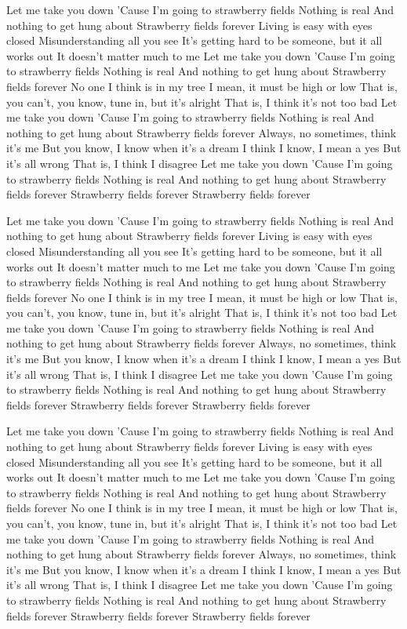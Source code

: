 \documentclass[12pt]{article}
\begin{document}
Let me take you down
'Cause I'm going to strawberry fields
Nothing is real
And nothing to get hung about
Strawberry fields forever
Living is easy with eyes closed
Misunderstanding all you see
It's getting hard to be someone, but it all works out
It doesn't matter much to me
Let me take you down
'Cause I'm going to strawberry fields
Nothing is real
And nothing to get hung about
Strawberry fields forever
No one I think is in my tree
I mean, it must be high or low
That is, you can't, you know, tune in, but it's alright
That is, I think it's not too bad
Let me take you down
'Cause I'm going to strawberry fields
Nothing is real
And nothing to get hung about
Strawberry fields forever
Always, no sometimes, think it's me
But you know, I know when it's a dream
I think I know, I mean a yes
But it's all wrong
That is, I think I disagree
Let me take you down
'Cause I'm going to strawberry fields
Nothing is real
And nothing to get hung about
Strawberry fields forever
Strawberry fields forever
Strawberry fields forever

Let me take you down
'Cause I'm going to strawberry fields
Nothing is real
And nothing to get hung about
Strawberry fields forever
Living is easy with eyes closed
Misunderstanding all you see
It's getting hard to be someone, but it all works out
It doesn't matter much to me
Let me take you down
'Cause I'm going to strawberry fields
Nothing is real
And nothing to get hung about
Strawberry fields forever
No one I think is in my tree
I mean, it must be high or low
That is, you can't, you know, tune in, but it's alright
That is, I think it's not too bad
Let me take you down
'Cause I'm going to strawberry fields
Nothing is real
And nothing to get hung about
Strawberry fields forever
Always, no sometimes, think it's me
But you know, I know when it's a dream
I think I know, I mean a yes
But it's all wrong
That is, I think I disagree
Let me take you down
'Cause I'm going to strawberry fields
Nothing is real
And nothing to get hung about
Strawberry fields forever
Strawberry fields forever
Strawberry fields forever

Let me take you down
'Cause I'm going to strawberry fields
Nothing is real
And nothing to get hung about
Strawberry fields forever
Living is easy with eyes closed
Misunderstanding all you see
It's getting hard to be someone, but it all works out
It doesn't matter much to me
Let me take you down
'Cause I'm going to strawberry fields
Nothing is real
And nothing to get hung about
Strawberry fields forever
No one I think is in my tree
I mean, it must be high or low
That is, you can't, you know, tune in, but it's alright
That is, I think it's not too bad
Let me take you down
'Cause I'm going to strawberry fields
Nothing is real
And nothing to get hung about
Strawberry fields forever
Always, no sometimes, think it's me
But you know, I know when it's a dream
I think I know, I mean a yes
But it's all wrong
That is, I think I disagree
Let me take you down
'Cause I'm going to strawberry fields
Nothing is real
And nothing to get hung about
Strawberry fields forever
Strawberry fields forever
Strawberry fields forever
\end{document}
